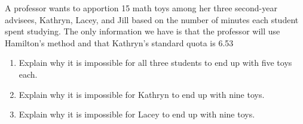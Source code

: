 \begin{Denumerate}
	\item A professor wants to apportion 15 math toys among her three second-year advisees, Kathryn, Lacey, and Jill based on the number of minutes each student spent studying.  The only information we have is that the professor will use Hamilton's method and that Kathryn's standard quota is 6.53
	\begin{enumerate}
		\item Explain why it is impossible for all three students to end up with five toys each.  \vfill
		\item Explain why it is impossible for Kathryn to end up with nine toys.  \vfill
		\item Explain why it is impossible for Lacey to end up with nine toys.  \vfill
\end{enumerate}
\end{Denumerate} \ENDHOMEWORK

\clearpage
